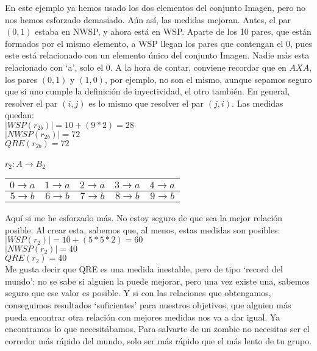 	\noindent
	En este ejemplo ya hemos usado los dos elementos del conjunto Imagen, pero no nos hemos esforzado demasiado. Aún así, las medidas mejoran. Antes, el par $(0,1)$ estaba en NWSP, y ahora está en WSP. Aparte de los 10 pares, que están formados por el mismo elemento, a WSP llegan los pares que contengan el 0, pues este está relacionado con un elemento único del conjunto Imagen. Nadie más esta relacionado con `a', solo el 0. A la hora de contar, conviene recordar que en $A X A$, los pares $(0,1)$ y $(1,0)$, por ejemplo, no son el mismo, aunque sepamos seguro que si uno cumple la definición de inyectividad, el otro también. En general, resolver el par $(i,j)$ es lo mismo que resolver el par $(j,i)$. Las medidas quedan:\\
	$|WSP(r_{2b})| = 10+(9*2) = 28$\\
	$|NWSP(r_{2b})| = 72$\\
	$QRE(r_{2b})=72$
	\\\\
	
	\noindent
	$r_{2}:A \longrightarrow B_{2}$
	\begin{table}[h!]
		\begin{tabular}{|c|c|c|c|c|}
			\hline
			$0 \longrightarrow a$ & $1 \longrightarrow a$ & $2 \longrightarrow a$ & $3 \longrightarrow a$ & $4 \longrightarrow a$ \\ 
			\hline
			$5 \longrightarrow b$ & $6 \longrightarrow b$ & $7 \longrightarrow b$ & $8 \longrightarrow b$ & $9 \longrightarrow b$ \\  
			\hline
		\end{tabular}
	\end{table}
	
	\noindent
	Aquí si me he esforzado más. No estoy seguro de que sea la mejor relación posible. Al crear esta, sabemos que, al menos, estas medidas son posibles:\\
	$|WSP(r_{2})| = 10+(5*5*2) = 60$\\
	$|NWSP(r_{2})| = 40$\\
	$QRE(r_{2})=40$
	\\
	
	
	\noindent
	Me gusta decir que QRE es una medida inestable, pero de tipo `record del mundo': no se sabe si alguien la puede mejorar, pero una vez existe una, sabemos seguro que ese valor es posible. Y si con las relaciones que obtengamos, conseguimos resultados `suficientes' para nuestros objetivos, que alguien más pueda encontrar otra relación con mejores medidas nos va a dar igual. Ya encontramos lo que necesitábamos. Para salvarte de un zombie no necesitas ser el corredor más rápido del mundo, solo ser más rápido que el más lento de tu grupo.
	\\
	
